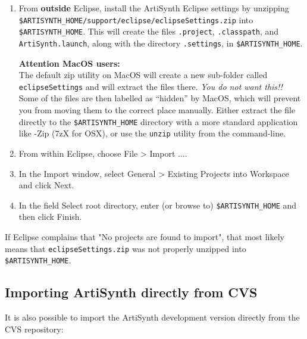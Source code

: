 \documentclass{article}
\begin{document}
\begin{enumerate}

\item From {\bf outside} Eclipse, install the ArtiSynth Eclipse settings by
  unzipping {\tt \$ARTISYNTH\_HOME/support/eclipse/eclipse\-Settings.zip} into
  {\tt \$ARTISYNTH\_HOME}. This will create the files {\tt .project},
  {\tt .classpath}, and {\tt ArtiSynth.launch}, along with the directory
  {\tt .settings}, in {\tt \$ARTISYNTH\_HOME}.
  
  \begin{sideblock}
  {\bf Attention MacOS users:}\\[0.5em]
  The default zip utility on MacOS will create a new sub-folder called 
  {\tt eclipseSettings} and will extract the files there.  \emph{You do not want this!!}
  Some of the files are then labelled as ``hidden'' by MacOS, which will
  prevent you from moving them to the correct place manually. 
  Either extract the file directly to the {\tt\$ARTISYNTH\_HOME} directory 
  with a more standard application like {-Zip} ({\sf 7zX} for OSX), 
  or use the {\tt unzip} utility from the command-line.
  \end{sideblock}


\item From within Eclipse, choose {\sf File > Import ...}.

\item In the {\sf Import} window, select {\sf General > Existing Projects into
  Workspace} and click {\sf Next}.

\item In the field {\sf Select root directory}, enter (or browse to) 
  {\tt \$ARTISYNTH\_HOME} and then click {\sf Finish}. 

\end{enumerate}

If Eclipse complains that {\sf "No projects are found to import"}, that most
likely means that {\tt eclipseSettings.zip} was not
properly unzipped into {\tt \$ARTISYNTH\_HOME}.

\subsection{Importing ArtiSynth directly from CVS}
\label{importingFromCVSSec}

It is also possible to import the ArtiSynth development version
directly from the CVS repository:
\end{document}
